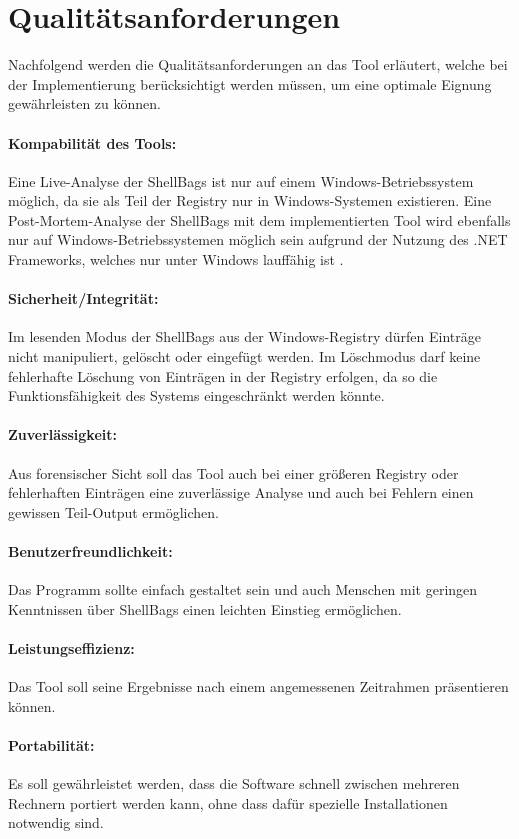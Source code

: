 \section{Qualitätsanforderungen}
Nachfolgend werden die Qualitätsanforderungen an das Tool erläutert, welche bei der Implementierung berücksichtigt werden müssen, um eine optimale Eignung gewährleisten zu können.
\paragraph{Kompabilität des Tools:}
Eine Live-Analyse der ShellBags ist nur auf einem Windows-Betriebssystem möglich, da sie als Teil der Registry nur in Windows-Systemen existieren. Eine Post-Mortem-Analyse der ShellBags mit dem implementierten Tool wird ebenfalls nur auf Windows-Betriebssystemen möglich sein aufgrund der Nutzung des .NET Frameworks, welches nur unter Windows lauffähig ist \cite{netfw}.
\paragraph{Sicherheit/Integrität:}
Im lesenden Modus der ShellBags aus der Windows-Registry dürfen Einträge nicht manipuliert, gelöscht oder eingefügt werden. Im Löschmodus darf keine fehlerhafte Löschung von Einträgen in der Registry erfolgen, da so die Funktionsfähigkeit des Systems eingeschränkt werden könnte.
\paragraph{Zuverlässigkeit:}
Aus forensischer Sicht soll das Tool auch bei einer größeren Registry oder fehlerhaften Einträgen eine zuverlässige Analyse und auch bei Fehlern einen gewissen Teil-Output ermöglichen.
\paragraph{Benutzerfreundlichkeit:}
Das Programm sollte einfach gestaltet sein und auch Menschen mit geringen Kenntnissen über ShellBags einen leichten Einstieg ermöglichen.
\paragraph{Leistungseffizienz:}
Das Tool soll seine Ergebnisse nach einem angemessenen Zeitrahmen präsentieren können.
\paragraph{Portabilität:}
Es soll gewährleistet werden, dass die Software schnell zwischen mehreren Rechnern portiert werden kann, ohne dass dafür spezielle Installationen notwendig sind.






